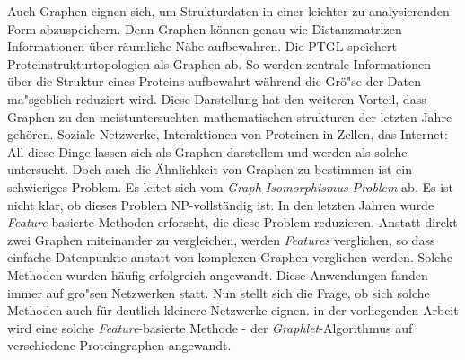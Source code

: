 \documentclass{report}
\begin{document}
Auch Graphen eignen sich, um Strukturdaten in einer leichter zu analysierenden Form abzuspeichern. Denn Graphen k\"onnen genau wie Distanzmatrizen Informationen \"uber r\"aumliche N\"ahe aufbewahren.
Die PTGL \cite{ptgl1} speichert Proteinstrukturtopologien als Graphen ab. So werden zentrale Informationen \"uber die Struktur eines Proteins aufbewahrt w\"ahrend die Gr\"o"se der Daten ma"sgeblich reduziert wird. Diese Darstellung hat den weiteren Vorteil, dass Graphen zu den meistuntersuchten mathematischen strukturen der letzten Jahre geh\"oren. Soziale Netzwerke, Interaktionen von Proteinen in Zellen, das Internet: All diese Dinge lassen sich als Graphen darstellem und werden als solche untersucht.
Doch auch die \"Ahnlichkeit von Graphen zu bestimmen ist ein schwieriges Problem. Es leitet sich vom \emph{Graph-Isomorphismus-Problem} ab. Es ist nicht klar, ob dieses Problem NP-vollst\"andig ist. In den letzten Jahren wurde \textit{Feature}-basierte Methoden erforscht, die diese Problem reduzieren. Anstatt direkt zwei Graphen miteinander zu vergleichen, werden \textit{Features} verglichen, so dass einfache Datenpunkte anstatt von komplexen Graphen verglichen werden.
Solche Methoden wurden h\"aufig erfolgreich angewandt. Diese Anwendungen fanden immer auf gro"sen Netzwerken statt. Nun stellt sich die Frage, ob sich solche Methoden auch f\"ur deutlich kleinere Netzwerke eignen. in der vorliegenden Arbeit wird eine solche \textit{Feature}-basierte Methode - der \textit{Graphlet}-Algorithmus auf verschiedene Proteingraphen angewandt. 








\end{document}
